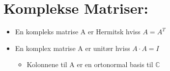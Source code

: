 \documentclass[12pt,a4paper,twocolumn,twoside]{article}
\begin{document}
\section*{Komplekse Matriser:}
\begin{itemize}[topsep=0pt,itemsep=0pt, partopsep=0pt]
    \item En kompleks matrise A er Hermitsk hviss $A=A^T$
    \item En komplex matrise A er unitær hviss $A\cdot A=I$
    \begin{itemize}[topsep=0pt,itemsep=0pt, partopsep=0pt]
        \item Kolonnene til A er en ortonormal basis til $\mathbb{C}$ 
    \end{itemize}
\end{itemize}
\end{document}
